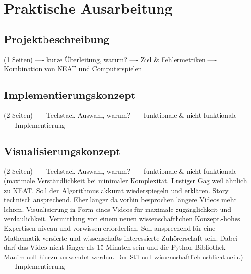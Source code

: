\chapter{Praktische Ausarbeitung}
\label{chapter:3}
\section{Projektbeschreibung}
(1 Seiten)
---- kurze Überleitung, warum?
---- Ziel \& Fehlermetriken
---- Kombination von NEAT und Computerspielen
\section{Implementierungskonzept}
(2 Seiten)
---- Techstack Auswahl, warum?
---- funktionale \& nicht funktionale
---- Implementierung  

\section{Visualisierungskonzept}
(2 Seiten)
---- Techstack Auswahl, warum?
---- funktionale \& nicht funktionale (maximale Verständlichkeit bei minimaler Komplexität. Lustiger Gag weil ähnlich zu NEAT. Soll den Algorithmus akkurat wiederspiegeln und erklären. Story technisch ansprechend. Eher länger da vorhin besprochen längere Videos mehr lehren. Visualisierung in Form eines Videos für maximale zugänglichkeit und verdaulichkeit. Vermittlung von einem neuen wissenschaftlichen Konzept.-hohes Expertisen niveau und vorwissen erforderlich. Soll ansprechend für eine Mathematik versierte und wissenschafts interessierte Zuhörerschaft sein. Dabei darf das Video nicht länger als 15 Minuten sein und die Python Bibliothek Manim soll hierzu verwendet werden. Der Stil soll wissenschaftlich schlicht sein.)
---- Implementierung 